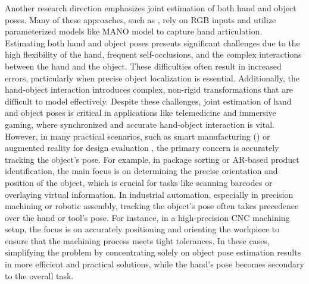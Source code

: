 Another research direction emphasizes joint estimation of both hand and object poses. Many of these approaches, such as \cite{doosti2020hope, lin2023harmonious, wang2023interacting, woo2023survey}, rely on RGB inputs and utilize parameterized models like MANO \cite{romero2022embodied} model to capture hand articulation. Estimating both hand and object poses presents significant challenges due to the high flexibility of the hand, frequent self-occlusions, and the complex interactions between the hand and the object. These difficulties often result in increased errors, particularly when precise object localization is essential. Additionally, the hand-object interaction introduces complex, non-rigid transformations that are difficult to model effectively. Despite these challenges, joint estimation of hand and object poses is critical in applications like telemedicine and immersive gaming, where synchronized and accurate hand-object interaction is vital. However, in many practical scenarios, such as smart manufacturing (\cite{son2022past}) or augmented reality for design evaluation \cite{park2015spatial}, the primary concern is accurately tracking the object's pose. For example, in package sorting or AR-based product identification, the main focus is on determining the precise orientation and position of the object, which is crucial for tasks like scanning barcodes or overlaying virtual information. In industrial automation, especially in precision machining or robotic assembly, tracking the object's pose often takes precedence over the hand or tool's pose. For instance, in a high-precision CNC machining setup, the focus is on accurately positioning and orienting the workpiece to ensure that the machining process meets tight tolerances. In these cases, simplifying the problem by concentrating solely on object pose estimation results in more efficient and practical solutions, while the hand's pose becomes secondary to the overall task.

